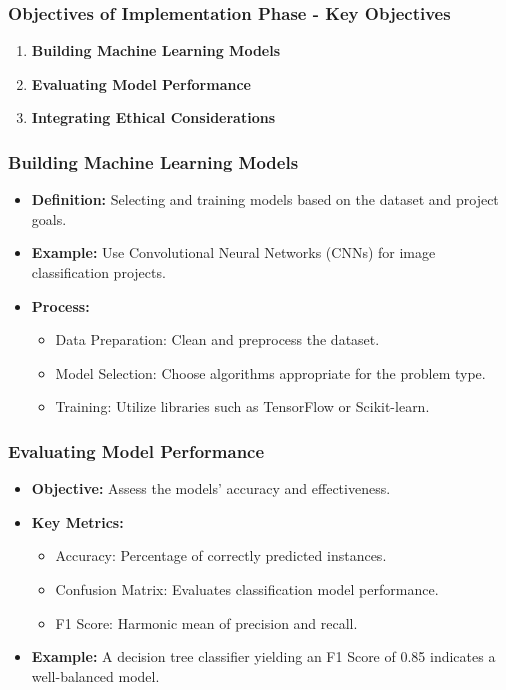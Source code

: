 \documentclass[aspectratio=169]{beamer}
\begin{document}
\begin{frame}[fragile]
    \frametitle{Objectives of Implementation Phase - Key Objectives}
    \begin{enumerate}
        \item \textbf{Building Machine Learning Models}
        \item \textbf{Evaluating Model Performance}
        \item \textbf{Integrating Ethical Considerations}
    \end{enumerate}
\end{frame}

\begin{frame}[fragile]
    \frametitle{Building Machine Learning Models}
    \begin{itemize}
        \item \textbf{Definition:} Selecting and training models based on the dataset and project goals.
        \item \textbf{Example:} Use Convolutional Neural Networks (CNNs) for image classification projects.
        \item \textbf{Process:}
        \begin{itemize}
            \item Data Preparation: Clean and preprocess the dataset.
            \item Model Selection: Choose algorithms appropriate for the problem type.
            \item Training: Utilize libraries such as TensorFlow or Scikit-learn.
        \end{itemize}
    \end{itemize}
\end{frame}

\begin{frame}[fragile]
    \frametitle{Evaluating Model Performance}
    \begin{itemize}
        \item \textbf{Objective:} Assess the models' accuracy and effectiveness.
        \item \textbf{Key Metrics:}
        \begin{itemize}
            \item Accuracy: Percentage of correctly predicted instances.
            \item Confusion Matrix: Evaluates classification model performance.
            \item F1 Score: Harmonic mean of precision and recall.
        \end{itemize}
        \item \textbf{Example:} A decision tree classifier yielding an F1 Score of 0.85 indicates a well-balanced model.
    \end{itemize}
\end{frame}
\end{document}
